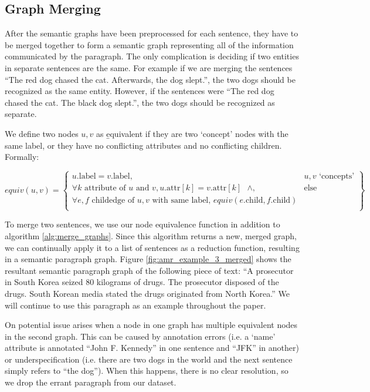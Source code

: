 \documentclass[12pt]{article}
\begin{document}
\subsection{Graph Merging}
After the semantic graphs have been preprocessed for each sentence, they have to be merged together to form a semantic graph representing all of the information communicated by the paragraph. The only complication is deciding if two entities in separate sentences are the same. For example if we are merging the sentences ``The red dog chased the cat. Afterwards, the dog slept.'', the two dogs should be recognized as the same entity. However, if the sentences were ``The red dog chased the cat. The black dog slept.'', the two dogs should be recognized as separate. 

We define two nodes $u, v$ as {\b equivalent} if they are two `concept' nodes with the same label, or they have no conflicting attributes and no conflicting children. Formally:

\[
    equiv(u,v) = \left\{\begin{array}{lr}
    u.\text{label} = v.\text{label}, & u,v \text{ `concepts'} \\
    \forall k \text{ attribute of } u \text{ and } v, u.\text{attr}[k] = v.\text{attr}[k] \text{ } \land, & \text{else} \\
    \forall e,f \text{ childedge of } u,v \text{ with same label, } equiv(e.\text{child}, f.\text{child}) & \\
    \end{array}\right\}
\]

To merge two sentences, we use our node equivalence function in addition to algorithm \ref{alg:merge_graphs}. Since this algorithm returns a new, merged graph, we can continually apply it to a list of sentences as a reduction function, resulting in a semantic paragraph graph. Figure \ref{fig:amr_example_3_merged} shows the resultant semantic paragraph graph of the following piece of text: ``A prosecutor in South Korea seized 80 kilograms of drugs. The prosecutor disposed of the drugs. South Korean media stated the drugs originated from North Korea.'' We will continue to use this paragraph as an example throughout the paper.

On potential issue arises when a node in one graph has multiple equivalent nodes in the second graph. This can be caused by annotation errors (i.e. a `name' attribute is annotated ``John F. Kennedy'' in one sentence and ``JFK'' in another) or underspecification (i.e. there are two dogs in the world and the next sentence simply refers to ``the dog''). When this happens, there is no clear resolution, so we drop the errant paragraph from our dataset.
\end{document}
